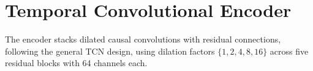 \section{Temporal Convolutional Encoder}
The encoder stacks dilated causal convolutions with residual connections, following the
general TCN design, using dilation factors $\{1, 2, 4, 8, 16\}$ across five residual blocks
with 64 channels each.
